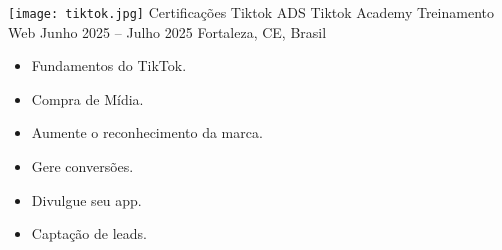 \begin{commentB}
\cvevent
	{\texttt{[image: tiktok.jpg]} Certificações Tiktok ADS%
		\quad%
		\hrulefill%
		}
	{Tiktok Academy \hfill \faEdge Treinamento Web}
	{Junho 2025 -- Julho 2025}
	{Fortaleza, CE, Brasil}
\vspace{-0.5em}
\begin{multicols}{2}
	\begin{itemize}[leftmargin=*,itemsep=0.5em,topsep=0.5em]
		\item Fundamentos do TikTok.
		\item Compra de Mídia.
		\item Aumente o reconhecimento da marca.
		\item Gere conversões.
		\item Divulgue seu app.
		\item Captação de leads.
	\end{itemize}
\end{multicols}
\end{commentB}
